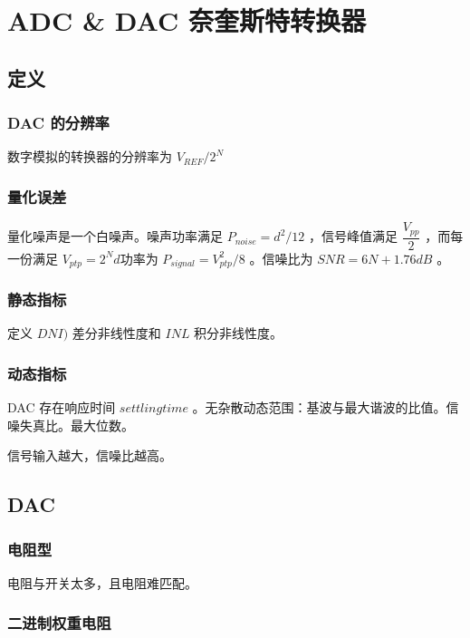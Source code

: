 \documentclass[cn,11pt,chinese,black,simple]{../elegantbook}
\begin{document}
\fi 
\def\chapname{10}

\chapter{ADC \& DAC 奈奎斯特转换器} 

\section{定义}

\subsection{DAC 的分辨率} 

数字模拟的转换器的分辨率为 \(V_{REF} / 2^N\) 

\subsection{量化误差} 

量化噪声是一个白噪声。噪声功率满足 \(P_{noise} = d^2/12\) ，信号峰值满足 \(\dfrac{V_{pp}}{2}\) ，而每一份满足 \(V_{ptp} = 2^N d\)功率为 \(P_{signal} = V_{ptp}^2 / 8\) 。信噪比为 \(SNR = 6 N + 1.76 dB\) 。

\subsection{静态指标}

定义 \(DNI)\) 差分非线性度和 \(INL\) 积分非线性度。

\subsection{动态指标}

DAC 存在响应时间 \(settling time\) 。无杂散动态范围：基波与最大谐波的比值。信噪失真比。最大位数。

信号输入越大，信噪比越高。

\section{DAC} 

\subsection{电阻型}

电阻与开关太多，且电阻难匹配。

\subsection{二进制权重电阻}
\end{document}
